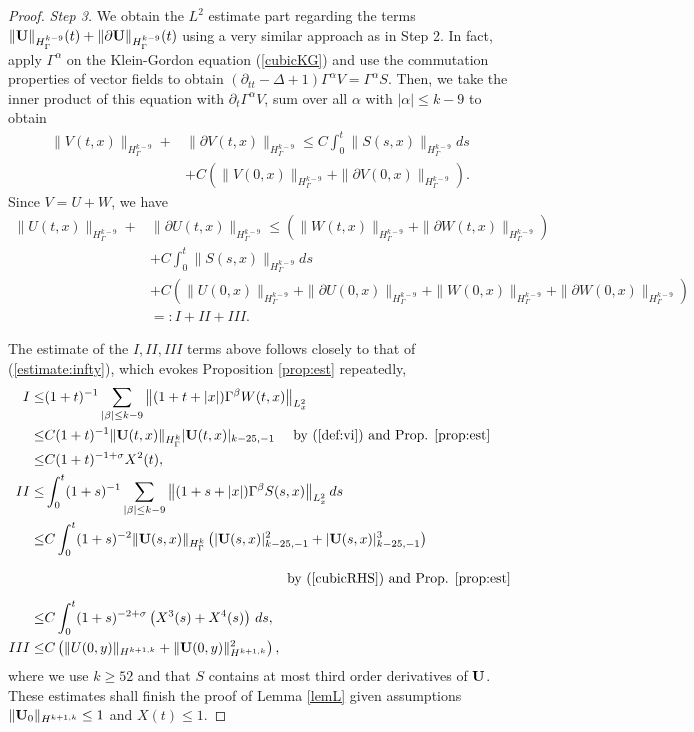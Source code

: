 \documentclass[12pt]{amsart}
\numberwithin{equation}{section} \numberwithin{theorem}{section}
\numberwithin{example}{section} \numberwithin{remark}{section}
\numberwithin{figure}{section} \numberwithin{algorithm}{section}
\def\vU{{\bf U}}
\def\pa{\partial}
\def\tpa{{\partial}}
\def\pt{\partial_t}
\def\ptt{\partial_{tt}}
\def\Ga{\Gamma^{\alpha}}
\def\Gb{\Gamma^{\beta}}
\def\LGN{|}
\def\RGN#1{|_{#1}}
\def\LGNN{\|}
\def\RGNN#1{\|_{H^{#1}_{\Gamma}}}
\def\Hw{H}
\begin{document}
\begin{proof}
\emph{Step 3.} We obtain the $L^2$ estimate part regarding the terms
\(\LGNN\vU\RGNN{k-9}(t)+\LGNN\tpa \vU\RGNN{k-9}(t)\) using a very
similar approach as in Step 2. In fact, apply $\Ga$ on the
Klein-Gordon equation (\ref{cubicKG}) and use the commutation
properties of vector fields to obtain \((\ptt -\Delta +1)\Ga V=\Ga
S\). Then, we take the inner product of this equation with $\pt\Ga
V$, sum over all $\alpha$ with $|\alpha|\le k-9$ to obtain
\[
\begin{split}\LGNN V(t,x)\RGNN{k-9}+&\LGNN \pa V(t,x)\RGNN{k-9}\le
C\int_0^t\LGNN S(s,x)\RGNN{k-9}ds\\&+C\left(\LGNN V(0,x)\RGNN{k-9}
+\LGNN \pa V(0,x)\RGNN{k-9}\right).\end{split}
\]
Since $V=U+W$, we have
\[
\begin{split}\LGNN U(t,x)\RGNN{k-9}+&\LGNN \pa U(t,x)\RGNN{k-9}
\le\left(\LGNN W(t,x)\RGNN{k-9}+\LGNN \pa W(t,x)\RGNN{k-9}\right)\\&
+C\int_0^t\LGNN S(s,x)\RGNN{k-9}ds\\&+ C\left(\LGNN
U(0,x)\RGNN{k-9}+\LGNN \pa U(0,x)\RGNN{k-9}+
\LGNN W(0,x)\RGNN{k-9}+\LGNN \pa W(0,x)\RGNN{k-9}\right)\\
&=:I+II+III.\end{split}
\]

The estimate of the $I,II,III$ terms above follows closely to that of
(\ref{estimate:infty}), which evokes Proposition \ref{prop:est} repeatedly,
\[\begin{split}I\le&(1+t)^{-1}\sum_{|\beta|\le k-9}\left\|(1+t+|x|)\Gb W(t,x)
\right\|_{L^2_x}\\
\le&C(1+t)^{-1}\LGNN \vU(t,x)\RGNN{k}\LGN \vU(t,x)\RGN{k-25,-1}
\quad\mbox{ by (\ref{def:vi}) and Prop. \ref{prop:est}}\\
\le&C(1+t)^{-1+\sigma}X^2(t),\\
II\le&\int_0^t(1+s)^{-1}\sum_{|\beta|\le k-9}\left\|(1+s+|x|)\Gb
S(s,x)
\right\|_{L^2_x}ds\\
\le&C\int_0^t(1+s)^{-2}\LGNN \vU(s,x)\RGNN{k} \left(\LGN
\vU(s,x)\RGN{k-25,-1}^2
+\LGN \vU(s,x)\RGN{k-25,-1}^3\right)\\
&\phantom{C\int_0^t(1+s)^{-2+\sigma}\left(X^3(s)+X^4(s)\right)\,ds}
\quad\mbox{ by (\ref{cubicRHS}) and Prop. \ref{prop:est}}\\
\le&C\int_0^t(1+s)^{-2+\sigma}\left(X^3(s)+X^4(s)\right)\,ds,\\
III\le&C\left(\|U(0,y)\|_{\Hw^{k+1,k}}+\|\vU(0,y)\|^2_{\Hw^{k+1,k}}\right),
\end{split}
\]
where we use $k\geq 52$ and that $S$ contains at most third order
derivatives of $\vU$. These estimates shall finish the proof of
Lemma \ref{lemL} given assumptions 
$\|\vU_0\|_{\Hw^{k+1,k}}\le1$ and $X(t)\le1$.
\end{proof}
\end{document}
